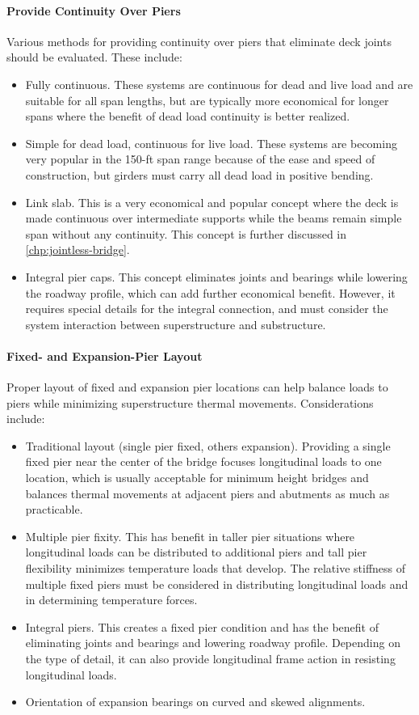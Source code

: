 \paragraph{Provide Continuity Over Piers}
Various methods for providing continuity over piers that eliminate deck joints should be evaluated. These include:
\begin{itemize}
  \item Fully continuous. These systems are continuous for dead and live load and are suitable for all span lengths, but are typically more economical for longer spans where the benefit of dead load continuity is better realized.
  \item Simple for dead load, continuous for live load. These systems are becoming very popular in the 150-ft span range because of the ease and speed of construction, but girders must carry all dead load in positive bending.
  \item Link slab. This is a very economical and popular concept where the deck is made continuous over intermediate supports while the beams remain simple span without any continuity. This concept is further discussed in \cref{chp:jointless-bridge}.
  \item  Integral pier caps. This concept eliminates joints and bearings while lowering the roadway profile, which can add further economical benefit. However, it requires special details for the integral connection, and must  consider the system interaction between superstructure and substructure.
\end{itemize}

\paragraph{Fixed- and Expansion-Pier Layout}
Proper layout of fixed and expansion pier locations can help balance loads to piers while minimizing
superstructure thermal movements. Considerations include:
\begin{itemize}
  \item Traditional layout (single pier fixed, others expansion). Providing a single fixed pier near the center of the
  bridge focuses longitudinal loads to one location, which is usually acceptable for minimum height bridges
  and balances thermal movements at adjacent piers and abutments as much as practicable.
  \item  Multiple pier fixity. This has benefit in taller pier situations where longitudinal loads can be distributed to
  additional piers and tall pier flexibility minimizes temperature loads that develop. The relative stiffness of
  multiple fixed piers must be considered in distributing longitudinal loads and in determining temperature
  forces.
  \item  Integral piers. This creates a fixed pier condition and has the benefit of eliminating joints and bearings and
  lowering roadway profile. Depending on the type of detail, it can also provide longitudinal frame action in
  resisting longitudinal loads.
  \item  Orientation of expansion bearings on curved and skewed alignments.
\end{itemize}

